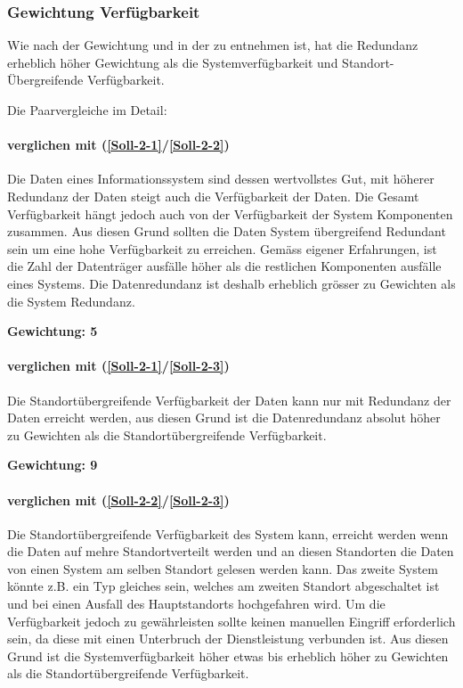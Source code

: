 \subsubsection{Gewichtung Verfügbarkeit}

Wie nach der Gewichtung und in der  zu entnehmen ist, hat die Redundanz erheblich höher Gewichtung als die Systemverfügbarkeit und Standort-Übergreifende Verfügbarkeit.

Die Paarvergleiche im Detail:

\paragraph*{ verglichen mit  (\ref{Soll-2-1}/\ref{Soll-2-2})}
Die Daten eines Informationssystem sind dessen wertvollstes Gut, mit höherer Redundanz der Daten steigt auch die Verfügbarkeit der Daten.
Die Gesamt Verfügbarkeit hängt jedoch auch von der Verfügbarkeit der System Komponenten zusammen. Aus diesen Grund sollten die Daten System übergreifend Redundant sein um eine hohe Verfügbarkeit zu erreichen. Gemäss eigener Erfahrungen, ist die Zahl der Datenträger ausfälle höher als die restlichen Komponenten ausfälle eines Systems. Die Datenredundanz ist deshalb erheblich grösser zu Gewichten als die System Redundanz.

\textbf{Gewichtung: 5}

\paragraph*{ verglichen mit  (\ref{Soll-2-1}/\ref{Soll-2-3})}
Die Standortübergreifende Verfügbarkeit der Daten kann nur mit Redundanz der Daten erreicht werden, aus diesen Grund ist die Datenredundanz absolut höher zu Gewichten als die Standortübergreifende Verfügbarkeit.

\textbf{Gewichtung: 9}

\paragraph*{ verglichen mit  (\ref{Soll-2-2}/\ref{Soll-2-3})}
Die Standortübergreifende Verfügbarkeit des System kann, erreicht werden wenn die Daten auf mehre Standortverteilt werden und an diesen Standorten die Daten von einen System am selben Standort gelesen werden kann. Das zweite System könnte z.B. ein Typ gleiches sein, welches am zweiten Standort abgeschaltet ist und bei einen Ausfall des Hauptstandorts hochgefahren wird.
Um die Verfügbarkeit jedoch zu gewährleisten sollte keinen manuellen Eingriff erforderlich sein, da diese mit einen Unterbruch der Dienstleistung verbunden ist. Aus diesen Grund ist die Systemverfügbarkeit höher etwas bis erheblich höher zu Gewichten als die  Standortübergreifende Verfügbarkeit.

